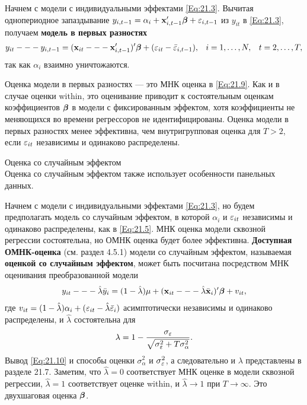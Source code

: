 Начнем с модели с индивидуальными эффектами \ref{Eq:21.3}. Вычитая однопериодное запаздывание $y_{i,t-1}=\alpha_i+\mathbf{x}'_{i,t-1} \bm{\beta} + \varepsilon_{i,t-1}$ из $y_{it}$ в  \ref{Eq:21.3}, получаем \textbf{модель в первых разностях}
\begin{align}
& y_{it} --- {y}_{i,t-1} = (\mathbf{x}_{it} --- \mathbf x'_{i,t-1})' \bm{\beta} + (\varepsilon_{it}-\bar{\varepsilon}_{i,t-1}),
& i=1, \dots, N, &
& t=2, \dots, T,
\label{Eq:21.9}
\end{align}
так как $\alpha_i$ взаимно уничтожаются.

Оценка модели в первых разностях --- это МНК оценка в \ref{Eq:21.9}. Как и в случае оценки within, это оценивание приводит к состоятельным оценкам коэффициентов $\bm{\beta}$  в модели с фиксированным эффектом, хотя коэффициенты не меняющихся во времени регрессоров не идентифицированы. Оценка модели в первых разностях менее эффективна, чем внутригрупповая оценка для $T>2$, если $\varepsilon_{it}$ независимы и одинаково распределены.

{\centering
Оценка со случайным эффектом\\}
Оценка со случайным эффектом также использует особенности панельных данных.

Начнем с модели с индивидуальными эффектами \ref{Eq:21.3}, но будем предполагать модель со случайным эффектом, в которой $\alpha_{i}$ и $\varepsilon_{it}$ независимы и одинаково распределены, как в \ref{Eq:21.5}. МНК оценка модели сквозной регрессии состоятельна, но ОМНК оценка будет более эффективна. \textbf{Доступная ОМНК-оценка} (см. раздел 4.5.1) модели со случайным эффектом, называемая \textbf{оценкой со случайным эффектом}, может быть посчитана посредством МНК оценивания преобразованной модели 
\begin{align}
y_{it} --- \hat{\lambda}\bar{y}_{i} = (1-\hat{\lambda})\mu+(\mathbf{x}_{it} --- \hat{\lambda}\bar{\mathbf{x}}_{i})' \bm{\beta} +v_{it},
\label{Eq:21.10}
\end{align}
где $v_{it}=(1-\hat{\lambda})\alpha_{i}+(\varepsilon_{it}-\hat{\lambda}{\bar{\varepsilon}}_{i})$ асимптотически независимы и одинаково распределены, и $\hat{\lambda}$ состоятельна для
\begin{align}
\lambda=1-\frac{\sigma_{\varepsilon}}
				{\sqrt{\sigma^2_{\varepsilon}+T\sigma^2_\alpha}}.
\label{Eq:21.11}
\end{align}
Вывод \ref{Eq:21.10} и способы оценки $\sigma^2_{\alpha}$  и $\sigma^2_{\varepsilon}$, а следовательно и $\lambda$ представлены в разделе 21.7. Заметим, что $\hat{\lambda}=0$ соответствует МНК оценке в модели сквозной регрессии, $\hat{\lambda}=1$ соответствует оценке within, и $\hat{\lambda} \rightarrow 1$ при $T \rightarrow \infty$. Это двухшаговая оценка $\bm{\beta}$.

